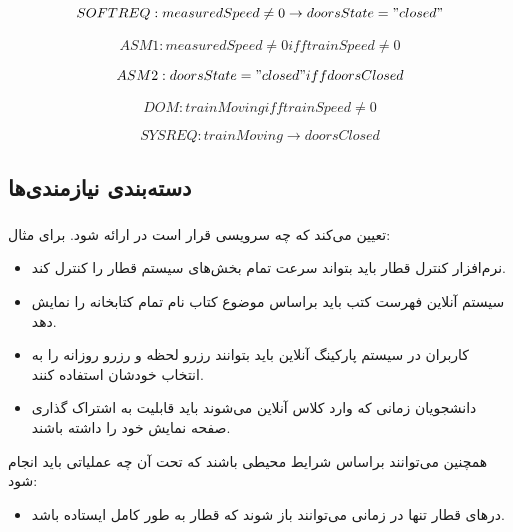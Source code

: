\begin{equation}
    SOFTREQ: measuredSpeed \neq 0 \rightarrow doorsState = "closed"
\end{equation}

\begin{equation}
    ASM1: measuredSpeed \neq 0 iff trainSpeed \neq 0
\end{equation}

\begin{equation}
    ASM2: doorsState = "closed" iff doorsClosed
\end{equation}

\begin{equation}
    DOM: trainMoving iff trainSpeed \neq 0 
\end{equation}

\begin{equation}
    SYSREQ: trainMoving \rightarrow doorsClosed 
\end{equation}

\subsection{دسته‌بندی نیازمندی‌ها}

\subsubsection{}

تعیین می‌کند که چه سرویسی قرار است در  ارائه شود. برای مثال:

\begin{itemize}
    \item نرم‌افزار کنترل قطار باید بتواند سرعت تمام بخش‌های سیستم قطار را کنترل
    کند.
    \item سیستم آنلاین فهرست کتب باید براساس موضوع کتاب نام تمام کتابخانه را
    نمایش دهد. 
    \item کاربران در سیستم پارکینگ آنلاین باید بتوانند رزرو لحظه و رزرو روزانه
    را به انتخاب خودشان استفاده کنند.
    \item دانشجویان زمانی که وارد کلاس آنلاین می‌شوند باید قابلیت به اشتراک
    گذاری صفحه نمایش خود را داشته باشند.
\end{itemize}

همچنین می‌توانند براساس شرایط محیطی باشند که تحت آن چه عملیاتی باید انجام شود:

\begin{itemize}
    \item در‌های قطار تنها در زمانی می‌توانند باز شوند که قطار به طور کامل ایستاده باشد.
\end{itemize}

